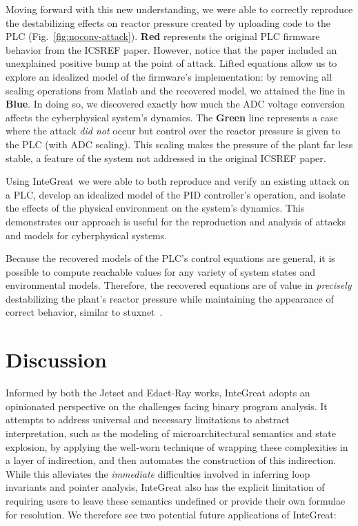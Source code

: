 Moving forward with this new understanding, we were able to correctly reproduce the destabilizing effects on reactor pressure created by uploading code to the PLC (Fig.~\ref{fig:noconv-attack}).
\textbf{Red} represents the original PLC firmware behavior from the ICSREF paper.
However, notice that the paper included an unexplained positive bump at the point of attack.
Lifted equations allow us to explore an idealized model of the firmware's implementation: by removing all scaling operations from Matlab and the recovered model, we attained the line in \textbf{Blue}.
In doing so, we discovered exactly how much the ADC voltage conversion affects the cyberphysical system's dynamics.
The \textbf{Green} line represents a case where the attack \emph{did not} occur but control over the reactor pressure is given to the PLC (with ADC scaling).
This scaling makes the pressure of the plant far less stable, a feature of the system not addressed in the original ICSREF paper.

Using InteGreat\ we were able to both reproduce and verify an existing attack on a PLC, develop an idealized model of the PID controller's operation, and isolate the effects of the physical environment on the system's dynamics.
This demonstrates our approach is useful for the reproduction and analysis of attacks and models for cyberphysical systems.

Because the recovered models of the PLC's control equations are general, it is possible to compute reachable values for any variety of system states and environmental models.
Therefore, the recovered equations are of value in \emph{precisely} destabilizing the plant's reactor pressure while maintaining the appearance of correct behavior, similar to stuxnet~\cite{baezner2017stuxnet}.

\section{Discussion}

Informed by both the Jetset and Edact-Ray works, InteGreat adopts an opinionated perspective on the challenges facing binary program analysis.
It attempts to address universal and necessary limitations to abstract interpretation, such as the modeling of microarchitectural semantics and state explosion, by applying the well-worn technique of wrapping these complexities in a layer of indirection, and then automates the construction of this indirection.
While this alleviates the \emph{immediate} difficulties involved in inferring loop invariants and pointer analysis, InteGreat also has the explicit limitation of requiring users to leave these semantics undefined or provide their own formulae for resolution.
We therefore see two potential future applications of InteGreat:

